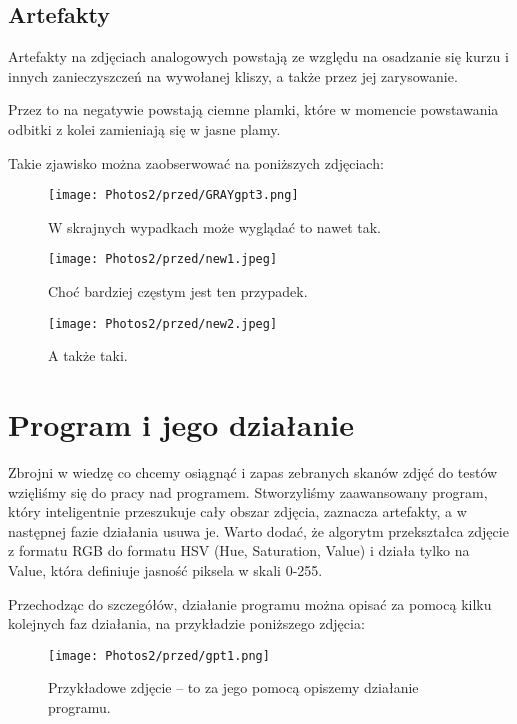 \documentclass[]{mwart}
\begin{document}

\newpage
\subsection{Artefakty}
Artefakty na zdjęciach analogowych powstają ze względu na osadzanie się kurzu i innych zanieczyszczeń na wywołanej kliszy,
a także przez jej zarysowanie.

Przez to na negatywie powstają ciemne plamki, które w momencie powstawania odbitki z kolei zamieniają się w jasne plamy.

Takie zjawisko można zaobserwować na poniższych zdjęciach:

\begin{figure}[H]
    \centering
    \texttt{[image: Photos2/przed/GRAYgpt3.png]}
    \caption{W skrajnych wypadkach może wyglądać to nawet tak.}
\end{figure}

\begin{figure}[H]
    \centering
    \texttt{[image: Photos2/przed/new1.jpeg]}
    \caption{Choć bardziej częstym jest ten przypadek.}
\end{figure}

\begin{figure}[H]
    \centering
    \texttt{[image: Photos2/przed/new2.jpeg]}
    \caption{A także taki.}
\end{figure}

\newpage
\section{Program i jego działanie}
Zbrojni w wiedzę co chcemy osiągnąć i zapas zebranych skanów zdjęć do testów wzięliśmy się do pracy
nad programem. Stworzyliśmy zaawansowany program, który inteligentnie przeszukuje cały obszar zdjęcia, zaznacza artefakty,
a w następnej fazie działania usuwa je. Warto dodać, że algorytm przekształca zdjęcie z formatu RGB do formatu HSV (Hue, Saturation, Value) i działa tylko na Value,
która definiuje jasność piksela w skali 0-255.

Przechodząc do szczegółów, działanie programu można opisać za pomocą kilku kolejnych faz działania, na przykładzie poniższego zdjęcia:

\begin{figure}[H]
    \centering
    \texttt{[image: Photos2/przed/gpt1.png]}
    \caption{Przykładowe zdjęcie -- to za jego pomocą opiszemy działanie programu.}
\end{figure}
\end{document}

